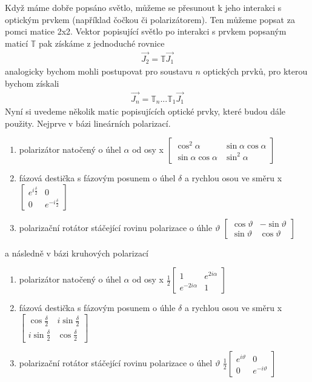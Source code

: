 Když máme dobře popsáno světlo, můžeme se přesunout k jeho interakci s optickým prvkem (například čočkou či polarizátorem). Ten můžeme popsat za pomci matice 2x2. Vektor popisující světlo po interakci s prvkem popsaným maticí $\mathbb{T}$ pak získáme z jednoduché rovnice
\begin{eqnarray}
\vec{J_2}=\mathbb{T}\vec{J_1}
\end{eqnarray}
analogicky bychom mohli postupovat pro soustavu $n$ optických prvků, pro kterou bychom získali
\begin{eqnarray}
\vec{J_n}=\mathbb{T}_n...\mathbb{T}_1\vec{J_1}
\end{eqnarray}
Nyní si uvedeme několik matic popisujících optické prvky, které budou dále použity. Nejprve v bázi lineárních polarizací.
\begin{enumerate}
\item polarizátor natočený o úhel $\alpha$ od osy x $\begin{bmatrix} \cos^2\alpha & \sin\alpha\cos\alpha \\ \sin\alpha\cos\alpha & \sin^2\alpha \end{bmatrix}$
\item fázová destička s fázovým posunem o úhel $\delta$ a rychlou osou ve směru x $\begin{bmatrix} e^{i\frac{\delta}{2}} & 0 \\ 0 & e^{-i\frac{\delta}{2}} \end{bmatrix}$
\item polarizační rotátor stáčející rovinu polarizace o úhle $\vartheta$ $\begin{bmatrix} \cos\vartheta & -\sin\vartheta \\ \sin\vartheta & \cos\vartheta \end{bmatrix}$
\end{enumerate}
a následně v bázi kruhových polarizací
\begin{enumerate}
\item polarizátor natočený o úhel $\alpha$ od osy x  $\frac{1}{2}\begin{bmatrix} 1 & e^{2i\alpha} \\ e^{-2i\alpha} & 1 \end{bmatrix}$
\item fázová destička s fázovým posunem o úhle $\delta$ a rychlou osou ve směru x  $\begin{bmatrix} \cos\frac{\delta}{2} & i\sin\frac{\delta}{2} \\ i\sin\frac{\delta}{2} & \cos\frac{\delta}{2} \end{bmatrix}$
\item polarizační rotátor stáčející rovinu polarizace o úhel $\vartheta$ $\frac{1}{2}\begin{bmatrix} e^{i\vartheta} & 0 \\ 0 & e^{-i\vartheta} \end{bmatrix}$
\end{enumerate}

